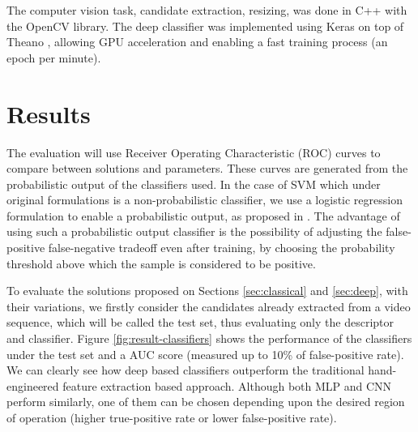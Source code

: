        The computer vision task, candidate extraction, resizing, was done in C++ with the OpenCV library. The deep classifier was implemented using Keras \cite{keras} on top of Theano \cite{theano}, allowing GPU acceleration and enabling a fast training process (an epoch per minute).


\section{Results}
\label{sec:results}

    The evaluation will use Receiver Operating Characteristic (ROC) curves to compare between solutions and parameters. These curves are generated from the probabilistic output of the classifiers used. In the case of SVM which under original formulations is a non-probabilistic classifier, we use a logistic regression formulation to enable a probabilistic output, as proposed in \cite{svmProbabilisticOutput}. The advantage of using such a probabilistic output classifier is the possibility of adjusting the false-positive false-negative tradeoff even after training, by choosing the probability threshold above which the sample is considered to be positive.

    To evaluate the solutions proposed on Sections \ref{sec:classical} and \ref{sec:deep}, with their variations, we firstly consider the candidates already extracted from a video sequence, which will be called the test set, thus evaluating only the descriptor and classifier. Figure \ref{fig:result-classifiers} shows the performance of the classifiers under the test set and a AUC score (measured up to 10\% of false-positive rate). We can clearly see how deep based classifiers outperform the traditional hand-engineered feature extraction based approach. Although both MLP and CNN perform similarly, one of them can be chosen depending upon the desired region of operation (higher true-positive rate or lower false-positive rate).

    \begin{figure*}[!t]
    \centering
    \label{fig:result-classifiers-all}
    \hfil
    \label{fig:result-classifiers-all-zoom}
    \caption{Classifiers performance.}
    \label{fig:result-classifiers}
    \end{figure*}

